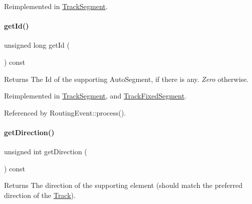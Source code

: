 Reimplemented in \mbox{\hyperlink{classKite_1_1TrackSegment_a4f040cf33009e4886d401115c3bea838}{Track\+Segment}}.

\mbox{\label{classKite_1_1TrackElement_afdedcef127ad2a3677a5b48d7d3453f3}} 
\paragraph{\texorpdfstring{get\+Id()}{getId()}}
{\footnotesize\ttfamily unsigned long get\+Id (\begin{DoxyParamCaption}{ }\end{DoxyParamCaption}) const\hspace{0.3cm}{\ttfamily [virtual]}}

\begin{DoxyReturn}{Returns}
The {\ttfamily Id} of the supporting Auto\+Segment, if there is any. {\itshape Zero} otherwise. 
\end{DoxyReturn}


Reimplemented in \mbox{\hyperlink{classKite_1_1TrackSegment_afdedcef127ad2a3677a5b48d7d3453f3}{Track\+Segment}}, and \mbox{\hyperlink{classKite_1_1TrackFixedSegment_afdedcef127ad2a3677a5b48d7d3453f3}{Track\+Fixed\+Segment}}.



Referenced by Routing\+Event\+::process().

\mbox{\label{classKite_1_1TrackElement_ae35b78590ed6aa546b626ef95f28c533}} 
\paragraph{\texorpdfstring{get\+Direction()}{getDirection()}}
{\footnotesize\ttfamily unsigned int get\+Direction (\begin{DoxyParamCaption}{ }\end{DoxyParamCaption}) const\hspace{0.3cm}{\ttfamily [pure virtual]}}

\begin{DoxyReturn}{Returns}
The direction of the supporting element (should match the preferred direction of the \mbox{\hyperlink{classKite_1_1Track}{Track}}). 
\end{DoxyReturn}


